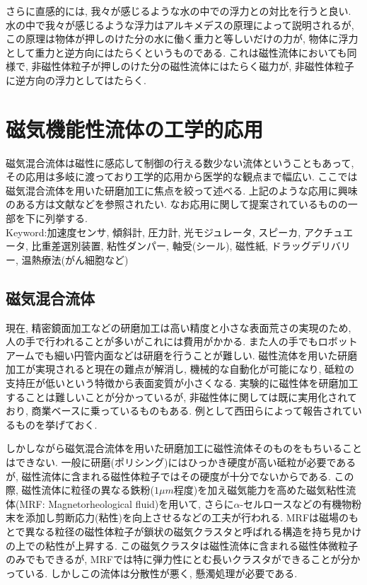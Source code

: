 \documentclass[b5,twocolumn,11pt]{jarticle}
\begin{document}
さらに直感的には, 我々が感じるような水の中での浮力との対比を行うと良い. 水の中で我々が感じるような浮力はアルキメデスの原理によって説明されるが, この原理は物体が押しのけた分の水に働く重力と等しいだけの力が, 物体に浮力として重力と逆方向にはたらくというものである. これは磁性流体においても同様で, 非磁性体粒子が押しのけた分の磁性流体にはたらく磁力が, 非磁性体粒子に逆方向の浮力としてはたらく. 

\section{磁気機能性流体の工学的応用}
磁気混合流体は磁性に感応して制御の行える数少ない流体ということもあって, その応用は多岐に渡っており工学的応用から医学的な観点まで幅広い. ここでは磁気混合流体を用いた研磨加工に焦点を絞って述べる. 上記のような応用に興味のある方は文献\cite{No7_磁性流体}などを参照されたい. なお応用に関して提案されているものの一部を下に列挙する. \\
Keyword:加速度センサ, 傾斜計, 圧力計, 光モジュレータ, スピーカ, アクチュエータ, 比重差選別装置, 粘性ダンパー, 軸受(シール), 磁性紙, ドラッグデリバリー, 温熱療法(がん細胞など)\par

     \subsection{磁気混合流体}
現在, 精密鏡面加工などの研磨加工は高い精度と小さな表面荒さの実現のため, 人の手で行われることが多いがこれには費用がかかる. また人の手でもロボットアームでも細い円管内面などは研磨を行うことが難しい. 磁性流体を用いた研磨加工が実現されると現在の難点が解消し, 機械的な自動化が可能になり, 砥粒の支持圧が低いという特徴から表面変質が小さくなる. 実験的に磁性体を研磨加工することは難しいことが分かっているが, 非磁性体に関しては既に実用化されており, 商業ベースに乗っているものもある. 例として西田らによって報告されているものを挙げておく\cite{No7_研磨}.\par
しかしながら磁気混合流体を用いた研磨加工に磁性流体そのものをもちいることはできない. 一般に研磨(ポリシング)にはひっかき硬度が高い砥粒が必要であるが, 磁性流体に含まれる磁性体粒子ではその硬度が十分でないからである. この際, 磁性流体に粒径の異なる鉄粉($1\mu m$程度)を加え磁気能力を高めた磁気粘性流体(MRF: Magnetorheological fluid)を用いて, さらに$\alpha$-セルロースなどの有機物粉末を添加し剪断応力(粘性)を向上させるなどの工夫が行われる. MRFは磁場のもとで異なる粒径の磁性体粒子が鎖状の磁気クラスタと呼ばれる構造を持ち見かけの上での粘性が上昇する. この磁気クラスタは磁性流体に含まれる磁性体微粒子のみでもできるが, MRFでは特に弾力性にとむ長いクラスタができることが分かっている. しかしこの流体は分散性が悪く, 懸濁処理が必要である. 
\end{document}

